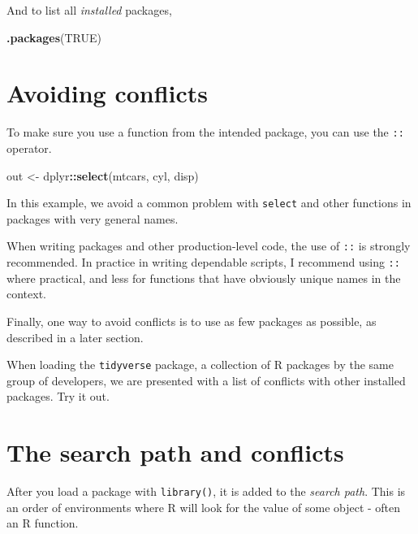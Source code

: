 \documentclass[]{book}
\newenvironment{Shaded}{\begin{snugshade}}{\end{snugshade}}
\newcommand{\KeywordTok}[1]{\textcolor[rgb]{0.13,0.29,0.53}{\textbf{#1}}}
\newcommand{\NormalTok}[1]{#1}
\newcommand{\OperatorTok}[1]{\textcolor[rgb]{0.81,0.36,0.00}{\textbf{#1}}}
\newcommand{\OtherTok}[1]{\textcolor[rgb]{0.56,0.35,0.01}{#1}}
\newcommand{\StringTok}[1]{\textcolor[rgb]{0.31,0.60,0.02}{#1}}
\let\BeginKnitrBlock\begin \let\EndKnitrBlock\end
\begin{document}
And to list all \emph{installed} packages,

\begin{Shaded}
\begin{Highlighting}[]
\KeywordTok{.packages}\NormalTok{(}\OtherTok{TRUE}\NormalTok{)}
\end{Highlighting}
\end{Shaded}

\hypertarget{avoidconflicts}{%
\section{Avoiding conflicts}\label{avoidconflicts}}

To make sure you use a function from the intended package, you can use the \texttt{::} operator.

\begin{Shaded}
\begin{Highlighting}[]
\NormalTok{out <-}\StringTok{ }\NormalTok{dplyr}\OperatorTok{::}\KeywordTok{select}\NormalTok{(mtcars, cyl, disp)}
\end{Highlighting}
\end{Shaded}

In this example, we avoid a common problem with \texttt{select} and other functions in packages with very general names.

When writing packages and other production-level code, the use of \texttt{::} is strongly recommended. In practice in writing dependable scripts, I recommend using \texttt{::} where practical, and less for functions that have obviously unique names in the context.

Finally, one way to avoid conflicts is to use as few packages as possible, as described in a later section.

\BeginKnitrBlock{rmdreading}
When loading the \texttt{tidyverse} package, a collection of R packages by the same group of developers, we are presented with a list of conflicts with other installed packages. Try it out.
\EndKnitrBlock{rmdreading}

\hypertarget{searchpath}{%
\section{The search path and conflicts}\label{searchpath}}

After you load a package with \texttt{library()}, it is added to the \emph{search path}. This is an order of environments where R will look for the value of some object - often an R function.
\end{document}
